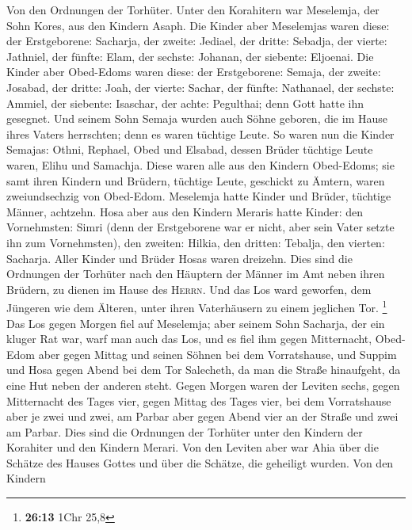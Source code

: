  Von den Ordnungen der Torhüter. Unter den Korahitern war
Meselemja, der Sohn Kores, aus den Kindern Asaph.  Die
Kinder aber Meselemjas waren diese: der Erstgeborene: Sacharja, der
zweite: Jediael, der dritte: Sebadja, der vierte: Jathniel,
 der fünfte: Elam, der sechste: Johanan, der siebente:
Eljoenai.  Die Kinder aber Obed-Edoms waren diese: der
Erstgeborene: Semaja, der zweite: Josabad, der dritte: Joah, der vierte:
Sachar, der fünfte: Nathanael,  der sechste: Ammiel, der
siebente: Isaschar, der achte: Pegulthai; denn Gott hatte ihn gesegnet.
 Und seinem Sohn Semaja wurden auch Söhne geboren, die im
Hause ihres Vaters herrschten; denn es waren tüchtige Leute.
 So waren nun die Kinder Semajas: Othni, Rephael, Obed und
Elsabad, dessen Brüder tüchtige Leute waren, Elihu und Samachja.
 Diese waren alle aus den Kindern Obed-Edoms; sie samt
ihren Kindern und Brüdern, tüchtige Leute, geschickt zu Ämtern, waren
zweiundsechzig von Obed-Edom.  Meselemja hatte Kinder und
Brüder, tüchtige Männer, achtzehn.  Hosa aber aus den
Kindern Meraris hatte Kinder: den Vornehmsten: Simri (denn der
Erstgeborene war er nicht, aber sein Vater setzte ihn zum Vornehmsten),
 den zweiten: Hilkia, den dritten: Tebalja, den vierten:
Sacharja. Aller Kinder und Brüder Hosas waren dreizehn. 
Dies sind die Ordnungen der Torhüter nach den Häuptern der Männer im Amt
neben ihren Brüdern, zu dienen im Hause des \textsc{Herrn}.
 Und das Los ward geworfen, dem Jüngeren wie dem Älteren,
unter ihren Vaterhäusern zu einem jeglichen Tor. \footnote{\textbf{26:13}
  1Chr 25,8}  Das Los gegen Morgen fiel auf Meselemja;
aber seinem Sohn Sacharja, der ein kluger Rat war, warf man auch das
Los, und es fiel ihm gegen Mitternacht,  Obed-Edom aber
gegen Mittag und seinen Söhnen bei dem Vorratshause,  und
Suppim und Hosa gegen Abend bei dem Tor Salecheth, da man die Straße
hinaufgeht, da eine Hut neben der anderen steht.  Gegen
Morgen waren der Leviten sechs, gegen Mitternacht des Tages vier, gegen
Mittag des Tages vier, bei dem Vorratshause aber je zwei und zwei,
 am Parbar aber gegen Abend vier an der Straße und zwei
am Parbar.  Dies sind die Ordnungen der Torhüter unter
den Kindern der Korahiter und den Kindern Merari.  Von
den Leviten aber war Ahia über die Schätze des Hauses Gottes und über
die Schätze, die geheiligt wurden.  Von den Kindern
